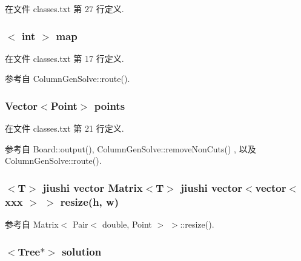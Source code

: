 在文件 classes.\+txt 第 27 行定义.

\subsubsection[{\texorpdfstring{map}{map}}]{$<$ int $>$ map}\hypertarget{classes_8txt_a0a12e395730487ab04f7f11cbc4d2132}{}\label{classes_8txt_a0a12e395730487ab04f7f11cbc4d2132}


在文件 classes.\+txt 第 17 行定义.



参考自 Column\+Gen\+Solve\+::route().

\subsubsection[{\texorpdfstring{points}{points}}]{ {\bf Vector}$<${\bf Point}$>$ points}\hypertarget{classes_8txt_ae368e6252d0add75ea011d5d90db68ed}{}\label{classes_8txt_ae368e6252d0add75ea011d5d90db68ed}


在文件 classes.\+txt 第 21 行定义.



参考自 Board\+::output(), Column\+Gen\+Solve\+::remove\+Non\+Cuts() , 以及 Column\+Gen\+Solve\+::route().

\subsubsection[{\texorpdfstring{resize}{resize}}]{$<$T$>$ jiushi vector {\bf Matrix}$<$T$>$ jiushi vector$<$vector$<$ xxx $>$ $>$ resize(h, w)}\hypertarget{classes_8txt_a91bb0844819b55afa331ca2a41d77b64}{}\label{classes_8txt_a91bb0844819b55afa331ca2a41d77b64}


参考自 Matrix$<$ Pair$<$ double, Point $>$ $>$\+::resize().

\subsubsection[{\texorpdfstring{solution}{solution}}]{$<${\bf Tree}$\ast$$>$ solution}\hypertarget{classes_8txt_aa43d5190bbc491d9c9134146e01a248e}{}\label{classes_8txt_aa43d5190bbc491d9c9134146e01a248e}


